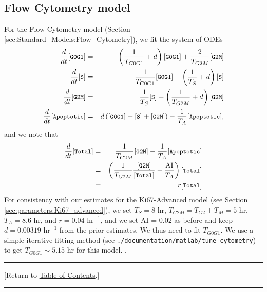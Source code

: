 \documentclass[12pt]{article}
\newcommand{\beqa}{\begin{eqnarray}}
\newcommand{\eeqa}{\end{eqnarray}}
\renewcommand{\v}{\verb}
\renewcommand{\tt}[1]{{\small \left[\texttt{#1}\right] }}
\newcommand{\TOClink}{\begin{center}\hrule\vskip-5pt\phantom{.}\hfill[Return to \hyperlink{TOC}{Table of Contents}.]\hfill\phantom{.}\vskip3pt\hrule\end{center}}
\begin{document}
\subsection{Flow Cytometry model}
\label{sec:parameters:flow_cytometry}
For the Flow Cytometry model (Section \ref{sec:Standard_Models:Flow_Cytometry}), 
we fit the system of ODEs 
\beqa
\frac{d}{dt}\tt{G0G1} & = & -\left( \frac{1}{T_{G0G1}} + d \right) \tt{G0G1} + \frac{2}{T_{G2M}}\tt{G2M}  \\
\frac{d}{dt}\tt{S} & = & \frac{1}{T_{G0G1}} \tt{G0G1} - \left( \frac{1}{T_{S}} + d \right) \tt{S} \\
\frac{d}{dt}\tt{G2M} & = &  \frac{1}{T_{S}} \tt{S} - \left( \frac{1}{T_{G2M}} + d \right) \tt{G2M} \\
\frac{d}{dt}\tt{Apoptotic} & = & d\left( \tt{G0G1} + \tt{S} + \tt{G2M} \right) -\frac{1}{T_A} \tt{Apoptotic}, 
\eeqa
and we note that 
\beqa
\frac{d}{dt}\tt{Total} 
& = & \frac{1}{T_{G2M}} \tt{G2M} - \frac{1}{T_A} \tt{Apoptotic} \nonumber \\ 
& = & \left( \frac{1}{T_{G2M}} \frac{\tt{G2M}}{\tt{Total}} - \frac{\textrm{AI}}{T_A} \right) \tt{Total} \nonumber \\ 
& = & r \tt{Total} 
\eeqa
For consistency with our estimates for the Ki67-Advanced model (see Section \ref{sec:parameters:Ki67_advanced}), 
we set $T_{S} = 8$ hr, $T_{G2M} = T_{G2} + T_{M} = 5$ hr, $T_A = 8.6$ hr, and 
$r = 0.04 \textrm{ hr}^{-1}$, and we set AI = 0.02 as before and keep 
$d = 0.00319 \textrm{ hr}^{-1}$ from the prior estimates. We thus need to fit  
$T_{G0G1}$. We use a simple iterative fitting method 
(see \v|./documentation/matlab/tune_cytometry|) to get $T_{G0G1} \sim 5.15 \textrm{ hr}$ for this model. 
\cite{ref:Ki67_MCF10A}. 

\TOClink 
\end{document}
